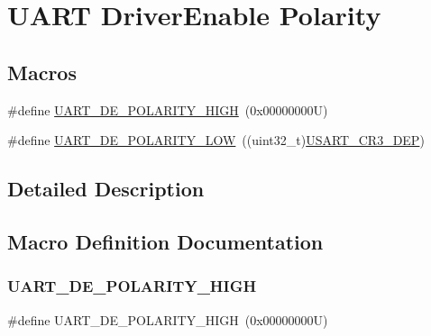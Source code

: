 \hypertarget{group___u_a_r_t___driver_enable___polarity}{}\section{U\+A\+RT Driver\+Enable Polarity}
\label{group___u_a_r_t___driver_enable___polarity}
\subsection*{Macros}
\begin{DoxyCompactItemize}
\item 
\#define \hyperlink{group___u_a_r_t___driver_enable___polarity_ga0cff167e046507f91497853b772282c5}{U\+A\+R\+T\+\_\+\+D\+E\+\_\+\+P\+O\+L\+A\+R\+I\+T\+Y\+\_\+\+H\+I\+GH}~(0x00000000\+U)
\item 
\#define \hyperlink{group___u_a_r_t___driver_enable___polarity_ga92a5839b1b14f95ee4b8f4842a24f37b}{U\+A\+R\+T\+\_\+\+D\+E\+\_\+\+P\+O\+L\+A\+R\+I\+T\+Y\+\_\+\+L\+OW}~((uint32\+\_\+t)\hyperlink{group___peripheral___registers___bits___definition_ga2000c42015289291da1c58fe27800d64}{U\+S\+A\+R\+T\+\_\+\+C\+R3\+\_\+\+D\+EP})
\end{DoxyCompactItemize}


\subsection{Detailed Description}


\subsection{Macro Definition Documentation}
\mbox{\label{group___u_a_r_t___driver_enable___polarity_ga0cff167e046507f91497853b772282c5}} 
\subsubsection{\texorpdfstring{U\+A\+R\+T\+\_\+\+D\+E\+\_\+\+P\+O\+L\+A\+R\+I\+T\+Y\+\_\+\+H\+I\+GH}{UART\_DE\_POLARITY\_HIGH}}
{\footnotesize\ttfamily \#define U\+A\+R\+T\+\_\+\+D\+E\+\_\+\+P\+O\+L\+A\+R\+I\+T\+Y\+\_\+\+H\+I\+GH~(0x00000000\+U)}

